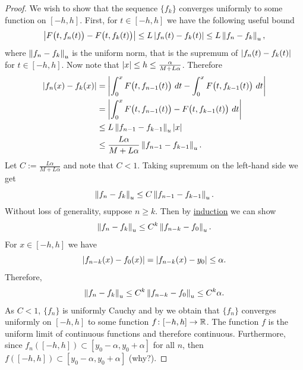 \begin{proof}
We wish to show that the sequence $\{ f_k \}$ converges uniformly
to some function on $[-h,h]$.  First, for $t \in [-h,h]$
we have the following
useful bound
\begin{equation*}
\left\lvert {F\bigl(t,f_{n}(t)\bigr) - 
F\bigl(t,f_{k}(t)\bigr)} \right\rvert
\leq
L \left\lvert {f_n(t)-f_k(t)} \right\rvert
\leq
L \left\lVert {f_n-f_k} \right\rVert_u ,
\end{equation*}
where $\left\lVert {f_n-f_k} \right\rVert_u$ is the uniform norm, that
is the supremum of $\left\lvert {f_n(t)-f_k(t)} \right\rvert$ for $t \in [-h,h]$.
Now note that $\left\lvert {x} \right\rvert \leq h \leq \frac{\alpha}{M+L\alpha}$.
Therefore
\begin{equation*}
\begin{split}
\left\lvert {f_n(x) - f_k(x)} \right\rvert
& =
\left\lvert {\int_{0}^x F\bigl(t,f_{n-1}(t)\bigr)~dt 
-
\int_{0}^x F\bigl(t,f_{k-1}(t)\bigr)~dt} \right\rvert
\\
& =
\left\lvert {\int_{0}^x F\bigl(t,f_{n-1}(t)\bigr)-
F\bigl(t,f_{k-1}(t)\bigr)~dt} \right\rvert
\\
& \leq
L\left\lVert {f_{n-1}-f_{k-1}} \right\rVert_u
\left\lvert {x} \right\rvert
\\
& \leq
\frac{L\alpha}{M+L\alpha}
\left\lVert {f_{n-1}-f_{k-1}} \right\rVert_u .
\end{split}
\end{equation*}
Let $C := \frac{L\alpha}{M+L\alpha}$ and note that $C < 1$.
Taking supremum on the left-hand side we get
\begin{equation*}
\left\lVert {f_n-f_k} \right\rVert_u \leq C \left\lVert {f_{n-1}-f_{k-1}} \right\rVert_u .
\end{equation*}
Without loss of generality,
suppose $n \geq k$.  Then by \hyperref[induction:thm]{induction} we can show 
\begin{equation*}
\left\lVert {f_n-f_k} \right\rVert_u \leq C^{k} \left\lVert {f_{n-k}-f_{0}} \right\rVert_u .
\end{equation*}
For $x \in [-h,h]$ we have
\begin{equation*}
\left\lvert {f_{n-k}(x)-f_{0}(x)} \right\rvert
=
\left\lvert {f_{n-k}(x)-y_0} \right\rvert
\leq \alpha .
\end{equation*}
Therefore,
\begin{equation*}
\left\lVert {f_n-f_k} \right\rVert_u \leq C^{k} \left\lVert {f_{n-k}-f_{0}} \right\rVert_u \leq C^{k} \alpha .
\end{equation*}
As $C < 1$, $\{f_n\}$ is uniformly Cauchy and by
 we obtain that $\{ f_n \}$
converges uniformly on $[-h,h]$ to some function $f \colon [-h,h] \to {\mathbb{R}}$.
The function $f$ is the uniform limit of continuous functions and therefore
continuous.  Furthermore, since $f_n([-h,h]) \subset
[y_0-\alpha,y_0+\alpha]$ for all $n$, then $f([-h,h]) \subset [y_0-\alpha,y_0+\alpha]$
(why?).



\end{proof}
